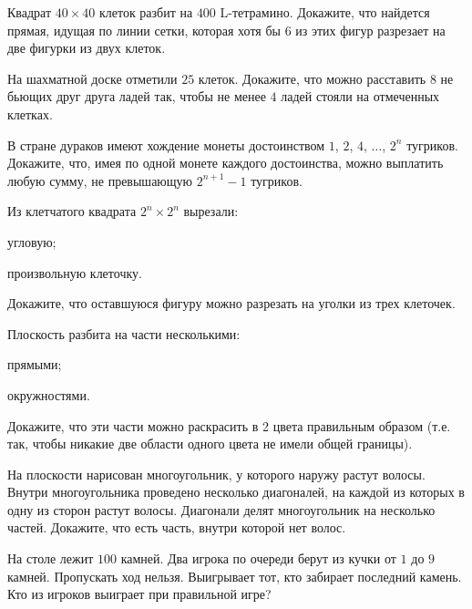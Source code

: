
\def\SheetNo{0}


\begin{problems}

\item Квадрат $40\times40$ клеток разбит на $400$ L-тетрамино. Докажите, что
найдется прямая, идущая по линии сетки, которая хотя бы $6$ из этих фигур
разрезает на две фигурки из двух клеток.

\item На шахматной доске отметили $25$ клеток. Докажите, что можно расставить
$8$ не бьющих друг друга ладей так, чтобы не менее $4$ ладей стояли на
отмеченных клетках.

\item В стране дураков имеют хождение монеты достоинством $1$, $2$, $4$, $\ldots$,
$2^n$ тугриков. Докажите, что, имея по одной монете каждого достоинства, можно
выплатить любую сумму, не превышающую $2^{n+1}-1$ тугриков.

\item Из клетчатого квадрата $2^n\times 2^n$ вырезали:
\begin{parts}
\item угловую;
\item произвольную клеточку.
\end{parts}
Докажите, что оставшуюся фигуру можно разрезать на уголки из трех клеточек.

\item Плоскость разбита на части несколькими:
\begin{parts}
\item прямыми;
\item окружностями.
\end{parts}
Докажите, что эти части можно раскрасить в 2 цвета правильным образом (т.е. так,
чтобы никакие две области одного цвета не имели общей границы).

\item На плоскости нарисован многоугольник, у которого наружу растут волосы.
Внутри многоугольника проведено несколько диагоналей, на каждой из которых в
одну из сторон растут волосы. Диагонали делят многоугольник на несколько частей.
Докажите, что есть часть, внутри которой нет волос.

\item На столе лежит \(100\) камней. Два игрока по очереди берут из кучки от \(1\) до \(9\) камней. Пропускать ход нельзя. Выигрывает тот, кто забирает последний камень.
Кто из игроков выиграет при правильной игре?


\end{problems}
